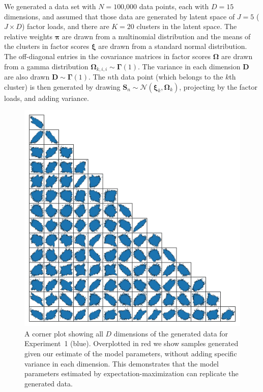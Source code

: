 \documentclass[twocolumn]{aastex62}
\newcommand{\vect}[1]{\boldsymbol{\mathbf{#1}}}
\renewcommand{\vec}[1]{\vect{#1}}
\newcommand{\weight}{\pi}
\newcommand{\factorscores}{\textbf{S}}
\newcommand{\specificvariance}{\vec{D}}
\newcommand{\scoremeans}{\vec\xi}
\newcommand{\scorecovs}{\vec\Omega}
\newcommand{\NumData}{N}
\newcommand{\NumDimensions}{D}
\newcommand{\numdata}{n}
\newcommand{\NumLatentFactors}{J}
\newcommand{\NumComponents}{K}
\newcommand{\numcomponents}{k}
\begin{document}
We generated a data set with ${\NumData = 1}$00,000 data points, each with
$\NumDimensions = 15$ dimensions, and assumed that those data are generated by
latent space of $\NumLatentFactors = 5$ ($\NumLatentFactors \times \NumDimensions$) factor loads, and there are $\NumComponents = 20$
clusters in the latent space. The relative weights $\vec\weight$
are drawn from a multinomial distribution and the means of the clusters
in factor scores $\scoremeans$ are drawn from a standard normal
distribution. The off-diagonal entries in the covariance matrices in factor scores $\scorecovs$ are drawn from a gamma distribution $\scorecovs_{\numcomponents,i,i} \sim \vec\Gamma\left(1\right)$. The variance in 
each dimension $\specificvariance$ are also drawn $\specificvariance \sim \vec\Gamma\left(1\right)$.
The $\numdata$th data point (which belongs to the $\numcomponents$th cluster) is then
generated by drawing $\factorscores_{\numdata} \sim \mathcal{N}(\scoremeans_\numcomponents,\scorecovs_\numcomponents)$, projecting by the factor loads, and adding variance.



\begin{figure}
	\includegraphics[width=1.0\textwidth]{experiments/exp1-data.png}
    \caption{A corner plot showing all $\NumDimensions$ dimensions of the
    		 generated data for Experiment~1 (blue). Overplotted in red
		 	 we show samples generated given our estimate of the model 
			 parameters, without adding specific variance in each dimension.
			 This demonstrates that the model parameters estimated by
			 expectation-maximization can replicate the generated data.}
    \label{fig:exp1-data}
\end{figure}
\end{document}
